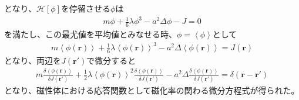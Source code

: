 \documentclass[a4paper,12pt, oneside, openany]{jsbook}
\begin{document}
となり、$\mathcal{H} \left[\phi\right]$を停留させる$\phi$は
\begin{eqnarray}
  m\phi +\frac{1}{6}\lambda \phi^3 -a^2  \Delta \phi -J=0
\end{eqnarray}
を満たし、この最尤値を平均値とみなせる時、$\phi = \left\langle \phi\right\rangle $として
\begin{eqnarray}
  m\left\langle \phi(\boldsymbol{r})\right\rangle +\frac{1}{6}\lambda \left\langle \phi(\boldsymbol{r})\right\rangle^3 -a^2  \Delta \left\langle \phi(\boldsymbol{r})\right\rangle  =J(\boldsymbol{r})
\end{eqnarray}
となり、両辺を$J(\boldsymbol{r}')$で微分すると
\begin{eqnarray}
  \label{応答関数の微分方程式}
  m\frac{\delta \left\langle \phi(\boldsymbol{r})\right\rangle}{\delta J(\boldsymbol{r}')} +\frac{1}{2} \lambda \left\langle \phi(\boldsymbol{r})\right\rangle^2 \frac{\delta \left\langle \phi(\boldsymbol{r})\right\rangle}{\delta J(\boldsymbol{r}')}-a^2 \Delta \frac{\delta \left\langle \phi(\boldsymbol{r})\right\rangle}{\delta J(\boldsymbol{r}')} =\delta(\boldsymbol{r}-\boldsymbol{r}')
\end{eqnarray}
となり、磁性体における応答関数として磁化率の関わる微分方程式が得られた。
\end{document}
